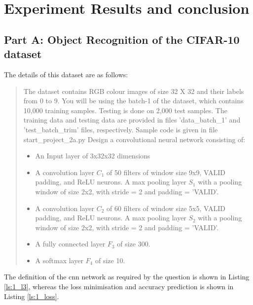 \chapter{Experiment Results and conclusion}
\label{expt}
\section{Part A: Object Recognition of the CIFAR-10 dataset}
\label{part1}

The details of this dataset are as follows:
\begin{quote}
The dataset contains RGB colour images of size 32 X 32 and their labels from 0 to 9. You will be using the batch-1 of the dataset, which contains 10,000 training samples. Testing is done on 2,000 test samples. The training data and testing data are provided in files 'data\_batch\_1' and 'test\_batch\_trim' files, respectively. Sample code is given in file start\_project\_2a.py Design a convolutional neural network consisting of:

\begin{itemize}
    \item An Input layer of 3x32x32 dimensions
    \item A convolution layer $C_1$ of 50 filters of window size 9x9, VALID padding, and ReLU neurons. A max pooling layer $S_1$ with a pooling window of size 2x2, with stride = 2 and padding = 'VALID'.
    \item A convolution layer $C_2$ of 60 filters of window size 5x5, VALID padding, and ReLU neurons. A max pooling layer $S_2$ with a pooling window of size 2x2, with stride = 2 and padding = 'VALID'.
    \item A fully connected layer $F_3$ of size 300.
    \item A softmax layer $F_4$ of size 10.
\end{itemize}
\end{quote}

The definition of the cnn network as required by the question is shown in Listing \ref{ls:1_l3}, whereas the loss minimisation and accuracy prediction is shown in Listing \ref{ls:1_loss}.

